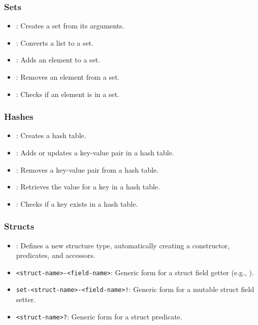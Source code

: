 \subsubsection{Sets}
\begin{itemize}
    \item {}: Creates a set from its arguments.
    \item {}: Converts a list to a set.
    \item {}: Adds an element to a set.
    \item {}: Removes an element from a set.
    \item {}: Checks if an element is in a set.
\end{itemize}

\subsubsection{Hashes}
\begin{itemize}
    \item {}: Creates a hash table.
    \item {}: Adds or updates a key-value pair in a hash table.
    \item {}: Removes a key-value pair from a hash table.
    \item {}: Retrieves the value for a key in a hash table.
    \item {}: Checks if a key exists in a hash table.
\end{itemize}

\subsubsection{Structs}
\begin{itemize}
    \item {}: Defines a new structure type, automatically creating a constructor, predicates, and accessors.
    \item \verb|<struct-name>-<field-name>|: Generic form for a struct field getter (e.g., ).
    \item \verb|set-<struct-name>-<field-name>!|: Generic form for a mutable struct field setter.
    \item \verb|<struct-name>?|: Generic form for a struct predicate.
\end{itemize}

